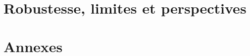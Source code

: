 \documentclass[11pt,a4paper]{report}
\begin{document}
\part{Robustesse, limites et perspectives}
\label{part:limites}

\appendix
\part*{Annexes}

\end{document}
